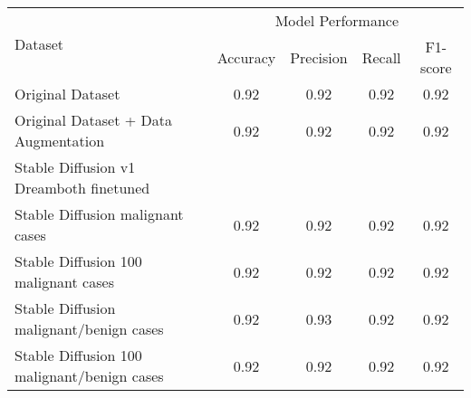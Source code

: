 \begin{table}[H]
\centering
\begin{tabular}{lcccc}
\toprule
\multirow{2}{*}{Dataset} & \multicolumn{4}{c}{Model Performance} \\
\cmidrule(lr){2-5}
  & Accuracy & Precision & Recall & F1-score \\
\midrule
Original Dataset & 0.92 & 0.92 & 0.92 & 0.92 \\
\midrule
Original Dataset + Data Augmentation & 0.92 & 0.92 & 0.92 & 0.92 \\
\midrule
Stable Diffusion v1 Dreamboth finetuned & \\
Stable Diffusion malignant cases & 0.92 & 0.92 & 0.92 & 0.92 \\
Stable Diffusion 100 malignant cases & 0.92 & 0.92 & 0.92 & 0.92 \\
Stable Diffusion malignant/benign cases & 0.92 & 0.93 & 0.92 & 0.92 \\
Stable Diffusion 100 malignant/benign cases & 0.92 & 0.92 & 0.92 & 0.92 \\
\bottomrule
\end{tabular}
\caption{}
\label{tab:melanoma_results_comparison}
\end{table}
